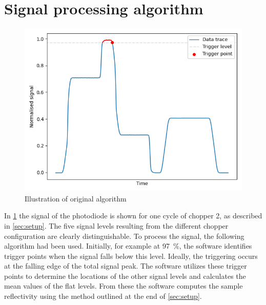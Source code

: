 \section{Signal processing algorithm}\label{sec:processing}


\begin{figure}
    \vspace{-\baselineskip}
    \centering
    \includegraphics[width=.98\textwidth]{images/old_trace.png}
    \caption{Illustration of original algorithm}
    \label{fig:trace}
\end{figure}
In \cref{fig:trace} the signal of the photodiode is shown for one cycle of chopper 2, as described in \cref{sec:setup}. The five signal levels resulting from the different chopper configuration are clearly distinguishable. To process the signal, the following algorithm had been used. Initially, for example at \qty{97}{\percent}, the software identifies trigger points when the signal falls below this level. Ideally, the triggering occurs at the falling edge of the total signal peak. The software utilizes these trigger points to determine the locations of the other signal levels and calculates the mean values of the flat levels. From these the software computes the sample reflectivity using the method outlined at the end of \cref{sec:setup}. 

